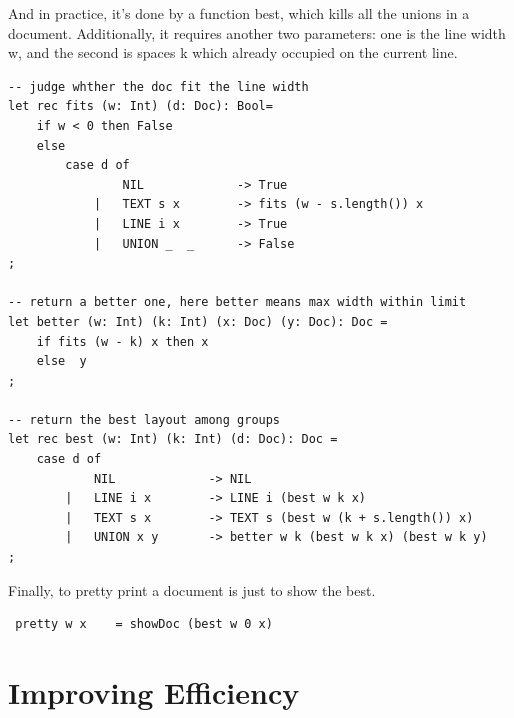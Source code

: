 And in practice, it's done by a function best, which kills all the unions in a document. Additionally, it requires another two parameters: one is the line width w, and the second is spaces k which already occupied on the current line.
\begin{lstlisting}
-- judge whther the doc fit the line width
let rec fits (w: Int) (d: Doc): Bool=
    if w < 0 then False
    else
        case d of
                NIL             -> True
            |   TEXT s x        -> fits (w - s.length()) x
            |   LINE i x        -> True
            |   UNION _  _      -> False
;

-- return a better one, here better means max width within limit
let better (w: Int) (k: Int) (x: Doc) (y: Doc): Doc =
    if fits (w - k) x then x
    else  y
;

-- return the best layout among groups
let rec best (w: Int) (k: Int) (d: Doc): Doc =
    case d of
            NIL             -> NIL
        |   LINE i x        -> LINE i (best w k x)
        |   TEXT s x        -> TEXT s (best w (k + s.length()) x)
        |   UNION x y       -> better w k (best w k x) (best w k y)
;
\end{lstlisting}

Finally, to pretty print a document is just to show the best.
\begin{lstlisting}
 pretty w x    = showDoc (best w 0 x)
\end{lstlisting}

\section{Improving Efficiency}

